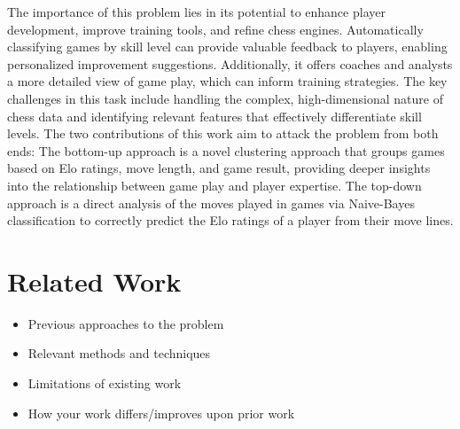 \documentclass[conference]{IEEEtran}
\begin{document}
The importance of this problem lies in its potential to enhance player development, improve training tools, and refine chess engines. Automatically classifying games by skill level can provide valuable feedback to players, enabling personalized improvement suggestions. Additionally, it offers coaches and analysts a more detailed view of game play, which can inform training strategies. The key challenges in this task include handling the complex, high-dimensional nature of chess data and identifying relevant features that effectively differentiate skill levels. The two contributions of this work aim to attack the problem from both ends: The bottom-up approach is a novel clustering approach that groups games based on Elo ratings, move length, and game result, providing deeper insights into the relationship between game play and player expertise. The top-down approach is a direct analysis of the moves played in games via Naive-Bayes classification to correctly predict the Elo ratings of a player from their move lines.

\section{Related Work}
\begin{itemize}
\item Previous approaches to the problem
\item Relevant methods and techniques
\item Limitations of existing work
\item How your work differs/improves upon prior work
\end{itemize}
\end{document}
